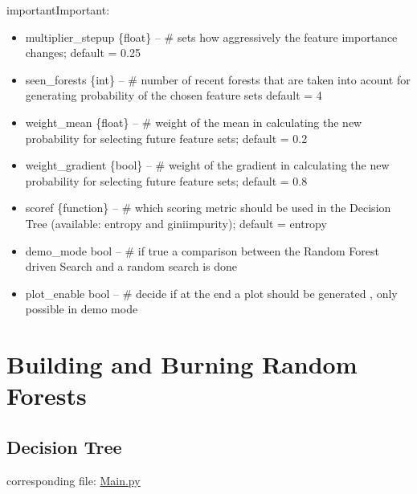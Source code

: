 \documentclass[letterpaper,10pt,english]{sphinxmanual}
\begin{document}
\begin{sphinxadmonition}{important}{Important:}
\begin{fulllineitems}
\begin{itemize}
\item {} 
multiplier\_stepup \{float\} -- \# sets how aggressively the feature importance changes; default = 0.25

\item {} 
seen\_forests \{int\} -- \# number of recent forests that are taken into acount for generating probability of the chosen feature sets default = 4

\item {} 
weight\_mean \{float\} -- \# weight of the mean in calculating the new probability for selecting future feature sets; default = 0.2

\item {} 
weight\_gradient \{bool\} -- \# weight of the gradient in calculating the new probability for selecting future feature sets; default = 0.8

\item {} 
scoref \{function\} -- \# which scoring metric should be used in the Decision Tree (available: entropy and giniimpurity); default = entropy

\item {} 
demo\_mode bool -- \# if true a comparison between the Random Forest driven Search and a random search is done

\item {} 
plot\_enable bool -- \# decide if at the end a plot should be generated , only possible in demo mode

\end{itemize}

\end{fulllineitems}

\end{sphinxadmonition}
\label{\detokenize{execution:blank}}\begin{figure}[htbp]
\centering

\noindent{}
\label{\detokenize{execution:blank}}\end{figure}


\chapter{Building and Burning Random Forests}
\label{\detokenize{index:building-and-burning-random-forests}}\label{\detokenize{index:loop}}

\section{Decision Tree}
\label{\detokenize{DT::doc}}\label{\detokenize{DT:decision-tree}}\label{\detokenize{DT:singletree}}
corresponding file: \href{https://github.com/weinertmos/ForestFire/blob/master/source/ForestFire/Main.py}{Main.py}
\end{document}
